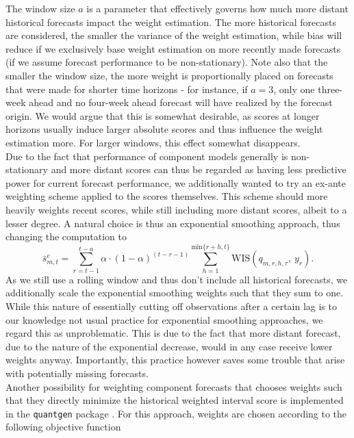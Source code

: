 The window size $a$ is a parameter that effectively governs how much more distant historical forecasts impact the weight estimation. The more historical forecasts are considered, the smaller the variance of the weight estimation, while bias will reduce if we exclusively base weight estimation on more recently made forecasts (if we assume forecast performance to be non-stationary). Note also that the smaller the window size, the more weight is proportionally placed on forecasts that were made for shorter time horizons - for instance, if $a = 3$, only one three-week ahead and no four-week ahead forecast will have realized by the forecast origin. We would argue that this is somewhat desirable, as scores at longer horizons usually induce larger absolute scores and thus influence the weight estimation more. For larger windows, this effect somewhat disappears.\\
Due to the fact that performance of component models generally is non-stationary and more distant scores can thus be regarded as having less predictive power for current forecast performance, we additionally wanted to try an ex-ante weighting scheme applied to the scores themselves. This scheme should more heavily weights recent scores, while still including more distant scores, albeit to a lesser degree. A natural choice is thus an exponential smoothing approach, thus changing the computation to\\
\begin{equation}
\bar{s}_{m,t}^{e} = \sum_{r = t-1}^{t-a} \alpha \cdot (1-\alpha)^{(t-r-1)} \sum_{h = 1}^{\text{min}\{r+h, t\}} \text{WIS}(q_{m, r, h, \tau}, \ y_r).
\end{equation}
As we still use a rolling window and thus don't include all historical forecasts, we additionally scale the exponential smoothing weights such that they sum to one. While this nature of essentially cutting off observations after a certain lag is to our knowledge not usual practice for exponential smoothing approaches, we regard this as unproblematic. This is due to the fact that more distant forecast, due to the nature of the exponential decrease, would in any case receive lower weights anyway. Importantly, this practice however saves some trouble that arise with potentially missing forecasts. \\ 
Another possibility for weighting component forecasts that chooses weights such that they directly minimize the historical weighted interval score is implemented in the \texttt{quantgen} package \citep{tibshirani_quantgen_2020}. For this approach, weights are chosen according to the following objective function \\
